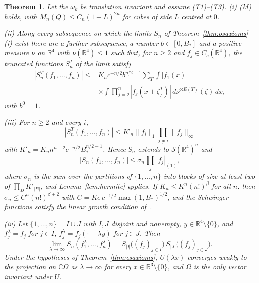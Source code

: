 \documentclass[aps,prd,twocolumn,superscriptaddress,nofootinbib,longbibliography,floatfix,amsmath,amssymb,10pt]{revtex4-2}
\newtheorem{theorem}{Theorem}
\theoremstyle{definition}
\theoremstyle{remark}
\newcommand{\R}{\mathbb{R}}
\newcommand{\C}{\mathbb{C}}
\begin{document}
\begin{theorem}\label{thm:ostree}
Let the $\omega_k$ be translation invariant and assume \textup{(T1)--(T3)}.
\textup{(i)} \textup{(M)} holds, with $M_n(Q)\le C_n(1+L)^{2n}$ for cubes of
side $L$ centred at $0$.

\textup{(ii)} Along every subsequence on which the limits $S_n$ of
Theorem~\textup{\ref{thm:osaxioms}(i)} exist there are a further
subsequence, a number $b\in[0,B_*]$ and a positive measure $\nu$ on $\R^4$
with $\nu(\R^4)\le1$ such that, for $n\ge2$ and $f_j\in C_c(\R^4)$, the
truncated functions $S^T_n$ of the limit satisfy
\[
\begin{split}
|S^T_n(f_1,\dots,f_n)|\le{}&K_nc^{-n/2}b^{n/2-1}\sum_T\int|f_1(x)|\\
&\times\int\prod_{j=2}^n|f_j(x+\zeta^T_j)|\,d\nu^{\otimes E(T)}(\zeta)\,dx ,
\end{split}
\]
with $b^0=1$.

\textup{(iii)} For $n\ge2$ and every $i$,
\[
|S^T_n(f_1,\dots,f_n)|\le K'_n\|f_i\|_1\prod_{j\ne i}\|f_j\|_\infty
\]
with $K'_n=K_nn^{n-2}c^{-n/2}B_*^{n/2-1}$. Hence $S_n$ extends to
$\mathcal S(\R^4)^n$ and
\[
|S_n(f_1,\dots,f_n)|\le\sigma_n\prod_j|f_j|_{(1)},
\]
where $\sigma_n$ is the
sum over the partitions of $\{1,\dots,n\}$ into blocks of size at least two
of $\prod_BK'_{|B|}$, and Lemma~\textup{\ref{lem:hermite}} applies. If
$K_n\le K^n(n!)^\beta$ for all $n$, then $\sigma_n\le C^n(n!)^{\beta+2}$
with $C=Ke\,c^{-1/2}\max(1,B_*)^{1/2}$, and the Schwinger functions satisfy
the linear growth condition of~\cite{OS75}.

\textup{(iv)} Let $\{1,\dots,n\}=I\cup J$ with $I,J$ disjoint and nonempty,
$y\in\R^4\setminus\{0\}$, and $f^\lambda_j=f_j$ for $j\in I$,
$f^\lambda_j=f_j(\cdot-\lambda y)$ for $j\in J$. Then
\[
\lim_{\lambda\to\infty}S_n(f^\lambda_1,\dots,f^\lambda_n)=
S_{|I|}\bigl((f_j)_{j\in I}\bigr)\,S_{|J|}\bigl((f_j)_{j\in J}\bigr).
\]
Under the hypotheses of Theorem~\textup{\ref{thm:osaxioms}}, $U(\lambda x)$
converges weakly to the projection on $\C\Omega$ as $\lambda\to\infty$ for
every $x\in\R^3\setminus\{0\}$, and $\Omega$ is the only vector invariant
under $U$.
\end{theorem}
\end{document}
